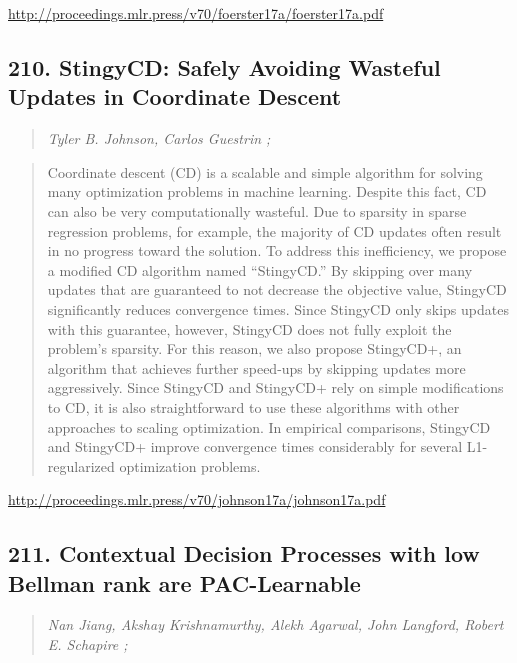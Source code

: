 \documentclass{article}
\begin{document}
\href{http://proceedings.mlr.press/v70/foerster17a/foerster17a.pdf}{http://proceedings.mlr.press/v70/foerster17a/foerster17a.pdf}

\subsection{210. StingyCD: Safely Avoiding Wasteful Updates in Coordinate Descent}

\begin{quote}
\footnotesize{\textit{Tyler B. Johnson, Carlos Guestrin ;}}

\end{quote}

\begin{quote}
    Coordinate descent (CD) is a scalable and simple algorithm for solving many optimization problems in machine learning. Despite this fact, CD can also be very computationally wasteful. Due to sparsity in sparse regression problems, for example, the majority of CD updates often result in no progress toward the solution. To address this inefficiency, we propose a modified CD algorithm named “StingyCD.” By skipping over many updates that are guaranteed to not decrease the objective value, StingyCD significantly reduces convergence times. Since StingyCD only skips updates with this guarantee, however, StingyCD does not fully exploit the problem’s sparsity. For this reason, we also propose StingyCD+, an algorithm that achieves further speed-ups by skipping updates more aggressively. Since StingyCD and StingyCD+ rely on simple modifications to CD, it is also straightforward to use these algorithms with other approaches to scaling optimization. In empirical comparisons, StingyCD and StingyCD+ improve convergence times considerably for several L1-regularized optimization problems.  
\end{quote}

\href{http://proceedings.mlr.press/v70/johnson17a/johnson17a.pdf}{http://proceedings.mlr.press/v70/johnson17a/johnson17a.pdf}

\subsection{211. Contextual Decision Processes with low Bellman rank are PAC-Learnable}

\begin{quote}
\footnotesize{\textit{Nan Jiang, Akshay Krishnamurthy, Alekh Agarwal, John Langford, Robert E. Schapire ;}}

\end{quote}
\end{document}
